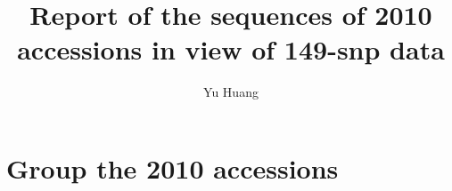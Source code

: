 \documentclass[a4paper,10pt]{article}
\title{Report of the sequences of 2010 accessions in view of 149-snp data}
\author{Yu Huang}
\begin{document}
\maketitle

\begin{abstract}
\end{abstract}

\section{Group the 2010 accessions}


\end{document}
